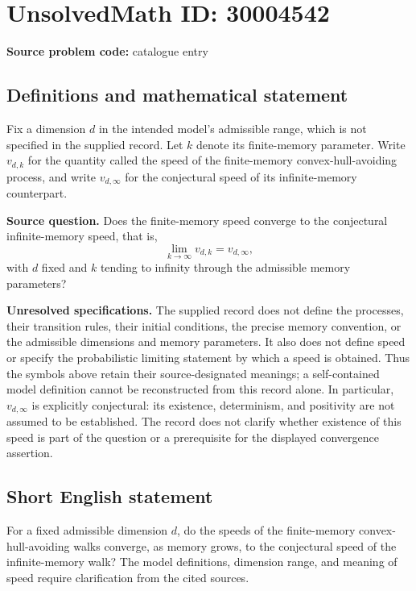 \documentclass[11pt]{article}
\begin{document}
\section*{UnsolvedMath ID: 30004542}
\textbf{Source problem code:} catalogue entry
\subsection{Definitions and mathematical statement}
Fix a dimension \(d\) in the intended model's admissible range, which is not specified in the supplied record. Let \(k\) denote its finite-memory parameter. Write \(v_{d,k}\) for the quantity called the speed of the finite-memory convex-hull-avoiding process, and write \(v_{d,\infty}\) for the conjectural speed of its infinite-memory counterpart.

\textbf{Source question.} Does the finite-memory speed converge to the conjectural infinite-memory speed, that is,
\[
\lim_{k\to\infty} v_{d,k}=v_{d,\infty},
\]
with \(d\) fixed and \(k\) tending to infinity through the admissible memory parameters?

\textbf{Unresolved specifications.} The supplied record does not define the processes, their transition rules, their initial conditions, the precise memory convention, or the admissible dimensions and memory parameters. It also does not define speed or specify the probabilistic limiting statement by which a speed is obtained. Thus the symbols above retain their source-designated meanings; a self-contained model definition cannot be reconstructed from this record alone. In particular, \(v_{d,\infty}\) is explicitly conjectural: its existence, determinism, and positivity are not assumed to be established. The record does not clarify whether existence of this speed is part of the question or a prerequisite for the displayed convergence assertion.
\subsection{Short English statement}
For a fixed admissible dimension \(d\), do the speeds of the finite-memory convex-hull-avoiding walks converge, as memory grows, to the conjectural speed of the infinite-memory walk? The model definitions, dimension range, and meaning of speed require clarification from the cited sources.
\end{document}
